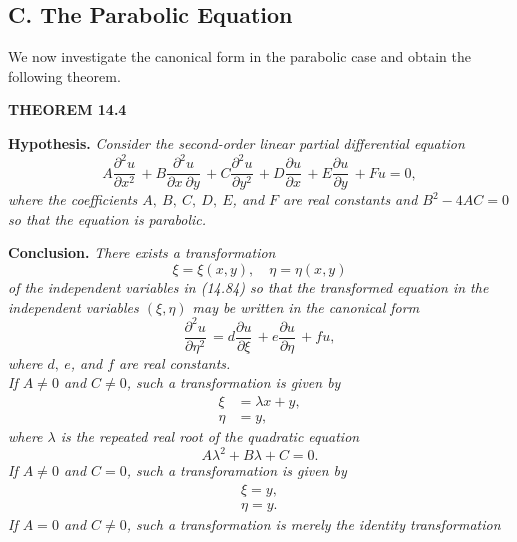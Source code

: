 \documentclass[11pt,a4paper, twoside]{report}
\newcommand{\pf}[2]{\dfrac{\partial #1}{\partial #2}\,}
\newcommand{\pfn}[3]{\dfrac{\partial^#3 #1}{\partial #2^#3}\,}
\newcommand{\pfp}[4]{\dfrac{\partial^#4 #1}{\partial #2\ \partial #3}\,}
\begin{document}
	\subsection*{C. The Parabolic Equation}
	We now investigate the canonical form in the parabolic case and obtain the following theorem.\par 
	\textbf{\large THEOREM 14.4}\par
	\textbf{Hypothesis.} \textit{Consider the second-order linear partial differential equation}
	\begin{equation}\tag{14.84}
		A\pfn{u}{x}{2} + B\pfp{u}{x}{y}{2} + C\pfn{u}{y}{2} + D\pf{u}{x} + E \pf{u}{y} + Fu = 0,
	\end{equation}
	\textit{where the coefficients $A,\ B,\ C,\ D,\ E$, and $F$ are real constants and $B^2-4AC = 0$ so that the equation is parabolic.}\par
	\textbf{Conclusion.} \textit{There exists a transformation}
	\begin{equation}\tag{14.85}
		\xi = \xi(x, y),\quad \eta = \eta(x, y)
	\end{equation}
	\textit{of the independent variables in (14.84) so that the transformed equation in the independent variables $(\xi, \eta)$ may be written in the canonical form}
	\begin{equation}\tag{14.102}
		\pfn{u}{\eta}{2} = d\pf{u}{\xi} + e\pf{u}{\eta} + fu,
	\end{equation}
	\textit{where $d,\ e$, and $f$ are real constants.}\\
	\textit{If $A\neq 0$ and $C \neq 0$, such a transformation is given by}
	\begin{equation}\tag{14.103}
		\begin{aligned}
			\xi &= \lambda x + y,\\
			\eta &= y,
		\end{aligned}
	\end{equation}
	\textit{where $\lambda$ is the repeated real root of the quadratic equation}
	\begin{equation}\tag{14.104}
		A\lambda^2 + B\lambda + C = 0.
	\end{equation}
	\textit{If $A \neq 0$ and $C = 0$, such a transforamation is given by}
	\begin{equation}\tag{14.105}
		\begin{aligned}
			\xi = y,\\
			\eta = y.
		\end{aligned}
	\end{equation}
	\textit{If $A = 0$ and $C \neq 0$, such a transformation is merely the identity transformation}
\end{document}
